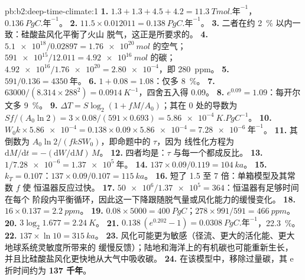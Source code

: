 \begin{solution}{pb:b2:deep-time-climate:1}
\textbf{1.} $1.3 + 1.3 + 4.5 + 4.2 = \qty{11.3}{Tmol.\text{年}^{-1}}$，$\qty{0.136}{PgC.\text{年}^{-1}}$。
\textbf{2.} $11.5\times0.012011 = \qty{0.138}{PgC.\text{年}^{-1}}$。
\textbf{3.} 二者在约 \qty{2}{\percent} 以内一致：硅酸盐风化平衡了火山
脱气，这正是所要求的。
\textbf{4.} $\num{5.1e18}/0.02897 = \qty{1.76e20}{mol}$ 的空气；$\num{591e15}/12.011 =
\qty{4.92e16}{mol}$ 的碳；$\num{4.92e16}/\num{1.76e20} = \num{2.80e-4}$，即 \qty{280}{ppm}。
\textbf{5.} $591/0.136 = \qty{4350}{\text{年}}$。
\textbf{6.} $1 + 0.08 = 1.08$：仅多 \qty{8}{\percent}。
\textbf{7.} $63000/(8.314\times288^2) = \qty{0.0914}{K^{-1}}$，四舍五入得 0.09。
\textbf{8.} $e^{0.09} = 1.09$：每开尔文多 \qty{9}{\percent}。
\textbf{9.} $\Delta T = S\log_2(1 + fM/A_0)$；其在 0 处的导数为 $Sf/(A_0\ln2) =
3\times0.08/(591\times0.693) = \qty{5.86e-4}{K.PgC^{-1}}$。
\textbf{10.} $W_0k\times\num{5.86e-4} = 0.138\times0.09\times\num{5.86e-4} = \qty{7.28e-6}{\text{年}^{-1}}$。
\textbf{11.} 其倒数为 $A_0\ln2/(fkSW_0)$，即命题中的 $\tau$，因为
线性化方程为 $\mathrm dM/\mathrm dt = -(\mathrm dW/\mathrm dM)\,M$。
\textbf{12.} 四者均是：$\tau$ 与每一个都成反比。
\textbf{13.} $1/\num{7.28e-6} = \qty{1.37e5}{\text{年}}$。
\textbf{14.} $137\times0.09/0.119 = \qty{104}{ka}$。
\textbf{15.} $k_T = 0.107$：$137\times0.09/0.107 = \qty{115}{ka}$。
\textbf{16.} 短了 1.5 至 7 倍：单箱模型及其常数 $f$ 使
恒温器反应过快。
\textbf{17.} $\num{50e6}/\num{1.37e5} = 364$：恒温器有足够时间在每个
阶段内平衡循环，因此这一下降跟随脱气量或风化能力的缓慢变化。
\textbf{18.} $16\times0.137 = \qty{2.2}{ppm}$。
\textbf{19.} $0.08\times5000 = \qty{400}{PgC}$；$278\times991/591 = \qty{466}{ppm}$。
\textbf{20.} $3\log_2 1.677 = \qty{2.24}{K}$。
\textbf{21.} $0.138\,(e^{0.202} - 1) = \qty{0.0308}{PgC.\text{年}^{-1}}$，\qty{22.3}{\percent}。
\textbf{22.} $137\times\ln10 = \qty{315}{ka}$。
\textbf{23.} 风化可能更为敏感（径流、更大的活化能、更大地球系统灵敏度所带来的
缓慢反馈）；陆地和海洋上的有机碳也可能重新生长，
并且比硅酸盐风化更快地从大气中吸收碳。
\textbf{24.} 在该模型中，移除过量碳，其
e 折时间约为 \textbf{\qty[text-series-to-math=true]{137}{} 千年}。
\end{solution}
